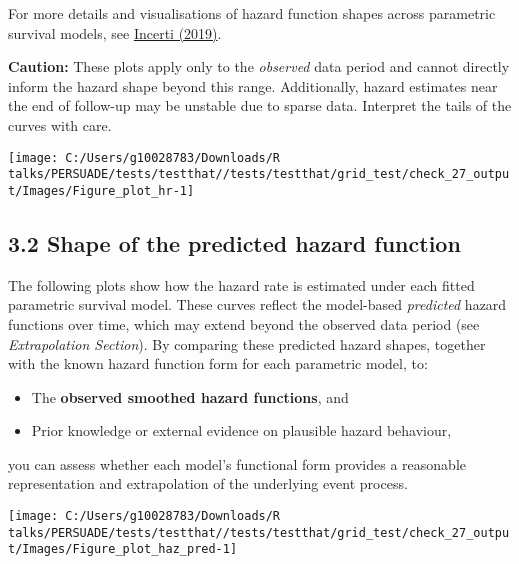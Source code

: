 \documentclass[
]{article}
\providecommand{\tightlist}{%
  \setlength{\itemsep}{0pt}\setlength{\parskip}{0pt}}
\begin{document}
For more details and visualisations of hazard function shapes across
parametric survival models, see
\href{https://devinincerti.com/2019/06/18/parametric_survival.html}{Incerti
(2019)}.

\textbf{Caution:} These plots apply only to the \emph{observed} data
period and cannot directly inform the hazard shape beyond this range.
Additionally, hazard estimates near the end of follow-up may be unstable
due to sparse data. Interpret the tails of the curves with care.

\clearpage

\begin{flushleft}\texttt{[image: C:/Users/g10028783/Downloads/R talks/PERSUADE/tests/testthat//tests/testthat/grid\_test/check\_27\_output/Images/Figure\_plot\_hr-1]} \end{flushleft}

\clearpage

\subsection{3.2 Shape of the predicted hazard
function}\label{shape-of-the-predicted-hazard-function}

The following plots show how the hazard rate is estimated under each
fitted parametric survival model. These curves reflect the model-based
\emph{predicted} hazard functions over time, which may extend beyond the
observed data period (see \emph{Extrapolation Section}). By comparing
these predicted hazard shapes, together with the known hazard function
form for each parametric model, to:

\begin{itemize}
\tightlist
\item
  The \textbf{observed smoothed hazard functions}, and\\
\item
  Prior knowledge or external evidence on plausible hazard behaviour,
\end{itemize}

you can assess whether each model's functional form provides a
reasonable representation and extrapolation of the underlying event
process.

\clearpage

\begin{flushleft}\texttt{[image: C:/Users/g10028783/Downloads/R talks/PERSUADE/tests/testthat//tests/testthat/grid\_test/check\_27\_output/Images/Figure\_plot\_haz\_pred-1]} \end{flushleft}
\end{document}
